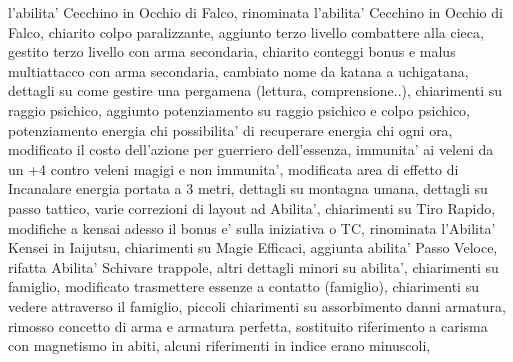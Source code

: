 \documentclass[a4paper,11pt,twoside,openany]{book}
\begin{document}
{l'abilita' Cecchino in Occhio di Falco, rinominata l'abilita' Cecchino in Occhio di Falco, chiarito colpo paralizzante, aggiunto terzo livello combattere alla cieca, gestito terzo livello con arma secondaria, chiarito conteggi bonus e malus multiattacco con arma secondaria, cambiato nome da katana a uchigatana, dettagli su come gestire una pergamena (lettura, comprensione..), chiarimenti su raggio psichico, aggiunto potenziamento su raggio psichico e colpo psichico, potenziamento energia chi possibilita' di recuperare energia chi ogni ora, modificato il costo dell'azione per guerriero dell'essenza, immunita' ai veleni da un +4 contro veleni magigi e non immunita', modificata area di effetto di Incanalare energia portata a 3 metri, dettagli su montagna umana, dettagli su passo tattico, varie correzioni di layout ad Abilita', chiarimenti su Tiro Rapido, modifiche a kensai adesso il bonus e' sulla iniziativa o TC, rinominata l'Abilita' Kensei in Iaijutsu, chiarimenti su Magie Efficaci, aggiunta abilita' Passo Veloce, rifatta Abilita' Schivare trappole, altri dettagli minori su abilita', chiarimenti su famiglio, modificato trasmettere essenze a contatto (famiglio), chiarimenti su vedere attraverso il famiglio, piccoli chiarimenti su assorbimento danni armatura,  rimosso concetto di arma e armatura perfetta, sostituito riferimento a carisma con magnetismo in abiti, alcuni riferimenti in indice erano minuscoli, 
}

\pagebreak

\printindex
\end{document}
